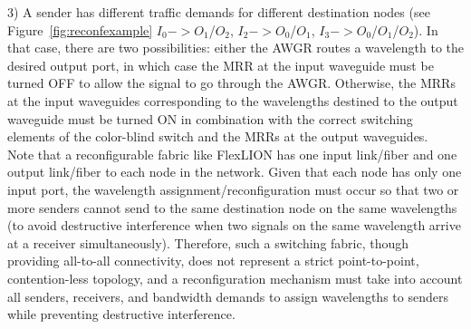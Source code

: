 3) A sender has different traffic demands for different destination nodes (see Figure~\ref{fig:reconfexample} $I_0->O_1$/$O_2$, $I_2->O_0$/$O_1$, $I_3->O_0$/$O_1$/$O_2$). In that case, there are two possibilities: either the AWGR routes a wavelength to the desired output port, in which case the MRR at the input waveguide must be turned OFF to allow the signal to go through the AWGR. Otherwise, the MRRs at the input waveguides corresponding to the wavelengths destined to the output waveguide must be turned ON in combination with the correct switching elements of the color-blind switch and the MRRs at the output waveguides. \\
Note that a reconfigurable fabric like FlexLION has one input link/fiber and one output link/fiber to each node in the network. Given that each node has only one input port, the wavelength assignment/reconfiguration must occur so that two or more senders cannot send to the same destination node on the same wavelengths (to avoid destructive interference when two signals on the same wavelength arrive at a receiver simultaneously). Therefore, such a switching fabric, though providing all-to-all connectivity, does not represent a strict point-to-point, contention-less topology, and a reconfiguration mechanism must take into account all senders, receivers, and bandwidth demands to assign wavelengths to senders while preventing destructive interference. 

